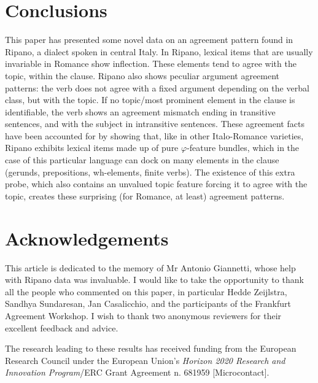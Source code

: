 \documentclass[output=paper
,modfonts
,nonflat]{langsci/langscibook}
\begin{document}
\section{Conclusions} \label{sec-dalessandro:6}
This paper has presented some novel data on an agreement pattern found in Ripano, a dialect spoken in central Italy. In Ripano, lexical items that are usually invariable in Romance show inflection. These elements tend to agree with the topic, within the clause.
Ripano also shows peculiar argument agreement patterns: the verb does not agree with a fixed argument depending on the verbal class, but with the topic. If no topic/most prominent element in the clause is identifiable, the verb shows an agreement mismatch ending in transitive sentences, and with the subject in intransitive sentences.
These agreement facts have been accounted for by showing that, like in other Italo-Romance varieties, Ripano exhibits lexical items made up of pure $\varphi $-feature bundles, which in the case of this particular language can dock on many elements in the clause (gerunds, prepositions, wh-elements, finite verbs). The existence of this extra probe, which also contains an unvalued topic feature forcing it to agree with the topic, creates these surprising (for Romance, at least) agreement patterns.

\section*{Acknowledgements}
This article is dedicated to the memory of Mr Antonio Giannetti, whose help with Ripano data was invaluable. 
I would like to take the opportunity to thank all the people who commented on this paper, in particular Hedde Zeijlstra, Sandhya Sundaresan, Jan Casalicchio, and the participants of the Frankfurt Agreement Workshop. I wish to thank two anonymous reviewers for their excellent feedback and advice.

The research leading to these results has received funding from the European Research Council under the European Union's \textit{Horizon 2020 Research and Innovation Program}\slash ERC Grant Agreement n. 681959 [Microcontact].

{\sloppy\printbibliography[heading=subbibliography,notkeyword=this]}
\end{document}
